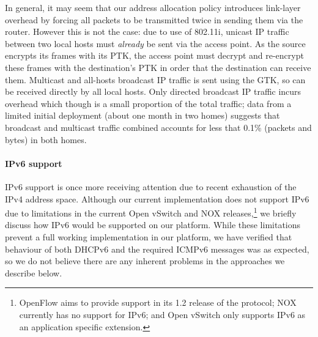 
In general, it may seem that our address allocation policy introduces link-layer
overhead by forcing all packets to be transmitted twice in sending them via the
router.  However this is not the case: due to use of 802.11i, unicast IP traffic
between two local hosts must \emph{already} be sent via the access point.  As
the source encrypts its frames with its PTK, the access point must decrypt and
re-encrypt these frames with the destination's PTK in order that the destination
can receive them.  Multicast and all-hosts broadcast IP traffic is sent using
the GTK, so can be received directly by all local hosts.  Only directed
broadcast IP traffic incurs overhead which though is a small proportion of the
total traffic; data from a limited initial deployment (about one month in two
homes) suggests that broadcast and multicast traffic combined accounts for less
that 0.1\% (packets and bytes) in both homes.

\paragraph{IPv6 support} IPv6 support is once more receiving attention due to
recent exhaustion of the IPv4 address space.  Although our current
implementation does not support IPv6 due to limitations in the current Open
vSwitch and NOX releases,\footnote{OpenFlow aims to provide support in its 1.2
  release of the protocol; NOX currently has no support for IPv6; and Open
  vSwitch only supports IPv6 as an application specific extension.} we briefly
discuss how IPv6 would be supported on our platform.  While these limitations
prevent a full working implementation in our platform, we have verified that
behaviour of both DHCPv6 and the required ICMPv6 messages was as expected, so we
do not believe there are any inherent problems in the approaches we describe
below.


